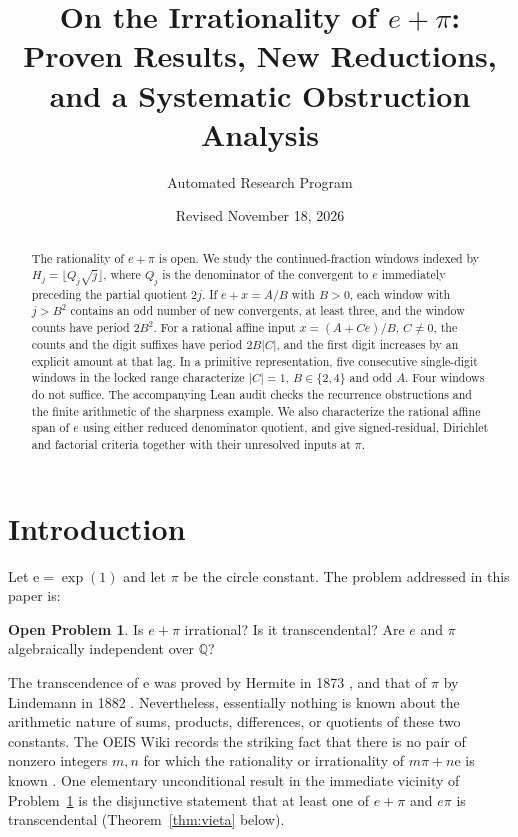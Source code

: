 \documentclass[11pt]{amsart}
\title[On the Irrationality of $e+\pi$]{On the Irrationality of $e+\pi$: Proven Results, New Reductions, and a Systematic Obstruction Analysis}
\author{Automated Research Program}
\date{Revised November 18, 2026}
\theoremstyle{definition}
\newtheorem{problem}[theorem]{Open Problem}
\theoremstyle{remark}
\numberwithin{equation}{section}
\newcommand{\Q}{\mathbb{Q}}
\newcommand{\ee}{\mathrm{e}}
\begin{document}
\begin{abstract}
The rationality of $e+\pi$ is open. We study the continued-fraction
windows indexed by $H_j=\lfloor Q_j\sqrt j\rfloor$, where $Q_j$ is the
denominator of the convergent to $e$ immediately preceding the partial
quotient $2j$. If $e+x=A/B$ with $B>0$, each window with $j>B^2$
contains an odd number of new convergents, at least three, and the
window counts have period $2B^2$. For a rational affine input
$x=(A+Ce)/B$, $C\ne0$, the counts and the digit suffixes have period
$2B|C|$, and the first digit increases by an explicit amount at that lag.
In a primitive representation, five consecutive single-digit windows
in the locked range characterize $|C|=1$, $B\in\{2,4\}$ and odd $A$.
Four windows do not suffice. The accompanying Lean audit checks the
recurrence obstructions and the finite arithmetic of the sharpness
example. We also characterize the rational affine span of $e$ using
either reduced denominator quotient, and give signed-residual,
Dirichlet and factorial criteria together with their unresolved inputs
at $\pi$.
\end{abstract}

\maketitle

\section{Introduction}\label{sec:intro}

Let $\ee=\exp(1)$ and let $\pi$ be the circle constant. The problem addressed in this paper is:

\begin{problem}\label{prob:main}
Is $e+\pi$ irrational? Is it transcendental? Are $e$ and $\pi$ algebraically independent over $\Q$?
\end{problem}

The transcendence of $\ee$ was proved by Hermite in 1873 \cite{Hermite1873}, and that of $\pi$ by Lindemann in 1882 \cite{Lindemann1882}. Nevertheless, essentially nothing is known about the arithmetic nature of sums, products, differences, or quotients of these two constants. The OEIS Wiki records the striking fact that there is no pair of nonzero integers $m,n$ for which the rationality or irrationality of $m\pi+n\ee$ is known \cite{OEIS}. One elementary unconditional result in the immediate vicinity of Problem~\ref{prob:main} is the disjunctive statement that at least one of $e+\pi$ and $e\pi$ is transcendental (Theorem~\ref{thm:vieta} below).
\end{document}
